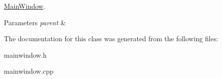 \hyperlink{classMainWindow}{Main\-Window}. 


\begin{DoxyParams}{Parameters}
{\em parent} & \\
\hline
\end{DoxyParams}


The documentation for this class was generated from the following files\-:\begin{DoxyCompactItemize}
\item 
mainwindow.\-h\item 
mainwindow.\-cpp\end{DoxyCompactItemize}
